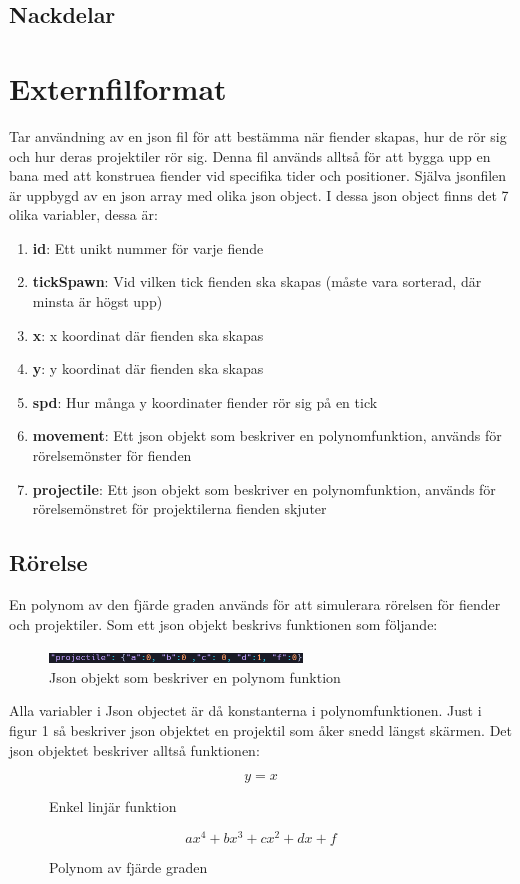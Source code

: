 \documentclass{TDP005mall}
\begin{document}
\subsection{Nackdelar}
\section{Externfilformat}
Tar användning av en json fil för att bestämma när fiender skapas, hur de rör sig och hur deras projektiler rör sig.
Denna fil används alltså för att bygga upp en bana med att konstruea fiender vid specifika tider och positioner.
Själva jsonfilen är uppbygd av en json array med olika json object. I dessa json object finns det 7 olika variabler, dessa är:
\begin{enumerate}
  \item \textbf{id}: Ett unikt nummer för varje fiende
  \item \textbf{tickSpawn}: Vid vilken tick fienden ska skapas (måste vara sorterad, där minsta är högst upp)
  \item \textbf{x}: x koordinat där fienden ska skapas
  \item \textbf{y}: y koordinat där fienden ska skapas
  \item \textbf{spd}: Hur många y koordinater fiender rör sig på en tick
  \item \textbf{movement}: Ett json objekt som beskriver en polynomfunktion, används för rörelsemönster för fienden
  \item \textbf{projectile}: Ett json objekt som beskriver en polynomfunktion, används för rörelsemönstret för projektilerna fienden skjuter
\end{enumerate}
\subsection{Rörelse}
En polynom av den fjärde graden används för att simulerara rörelsen för fiender och projektiler.
Som ett json objekt beskrivs funktionen som följande:\\
\begin{figure}[H]
  \begin{center}
    \includegraphics[width=0.6\textwidth]{poly.png}
  \end{center}
  \caption{Json objekt som beskriver en polynom funktion}
  \label{fig:}
\end{figure}
Alla variabler i Json objectet är då konstanterna i polynomfunktionen. Just i figur 1 så beskriver json objektet en projektil som åker snedd längst skärmen. 
Det json objektet beskriver alltså funktionen: 
\begin{figure}[H]
  \begin{center}
    $$y = x$$
  \end{center}
  \caption{Enkel linjär funktion}
  \label{fig:}
\end{figure}
\begin{figure}[H]
  \begin{center}
    $$ ax^4 + bx^3 + cx^2 + dx + f $$
  \end{center}
  \caption{Polynom av fjärde graden}
  \label{fig:}
\end{figure}
\end{document}
